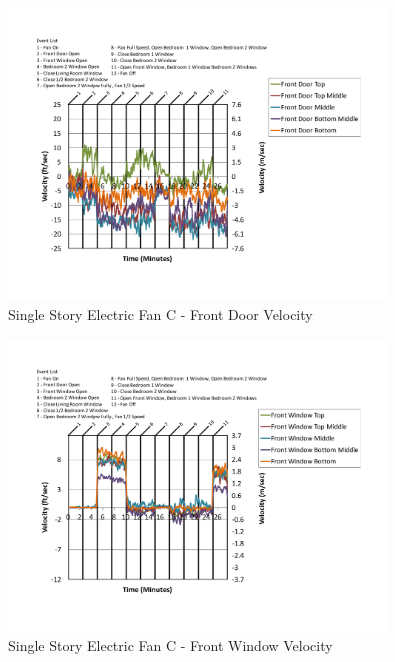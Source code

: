 \documentclass{article}
\begin{document}
\begin{appendices}
	\begin{figure}[H]
		\centering
		\includegraphics[height=3.05in,trim=0.67in 1.1in 0.67in 0.8in,clip=true]{0_Images/Results_Charts/ColdFlow/Single_Story/Electric/C/Front_Door_Velocity.pdf}
		\caption{Single Story Electric Fan C - Front Door Velocity}
	\end{figure}
 

	\begin{figure}[H]
		\centering
		\includegraphics[height=3.05in,trim=0.67in 1.1in 0.67in 0.8in,clip=true]{0_Images/Results_Charts/ColdFlow/Single_Story/Electric/C/Front_Window_Velocity.pdf}
		\caption{Single Story Electric Fan C - Front Window Velocity}
	\end{figure}
 
	\clearpage


\end{appendices}
\end{document}
